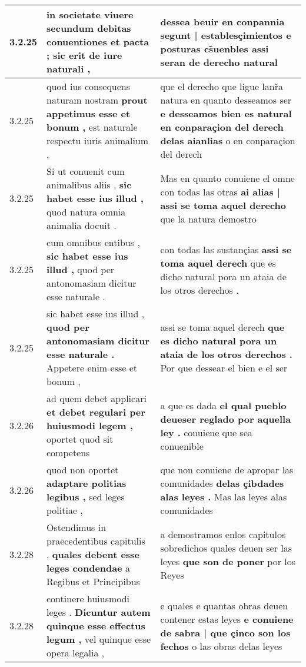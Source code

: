 \begin{tabular}{|p{1cm}|p{6.5cm}|p{6.5cm}|}
3.2.25 & in societate viuere \textbf{ secundum debitas conuentiones et pacta ; } sic erit de iure naturali , & dessea beuir en conpannia \textbf{ segunt | establesçimientos e posturas cs̃uenbles } assi seran de derecho natural \\\hline
3.2.25 & quod ius consequens naturam nostram \textbf{ prout appetimus esse et bonum , } est naturale respectu iuris animalium , & que el derecho que ligue lanr̃a natura en quanto desseamos ser \textbf{ e desseamos bien es natural en conparaçion del derech delas aianlias } o en conparaçion del derech \\\hline
3.2.25 & Si ut conuenit cum animalibus aliis , \textbf{ sic habet esse ius illud , } quod natura omnia animalia docuit . & Mas en quanto conuiene el omne con todas las otras \textbf{ ai alias | assi se toma aquel derecho } que la natura demostro \\\hline
3.2.25 & cum omnibus entibus , \textbf{ sic habet esse ius illud , } quod per antonomasiam dicitur esse naturale . & con todas las sustançias \textbf{ assi se toma aquel derech } que es dicho natural pora un ataia de los otros derechos . \\\hline
3.2.25 & sic habet esse ius illud , \textbf{ quod per antonomasiam dicitur esse naturale . } Appetere enim esse et bonum , & assi se toma aquel derech \textbf{ que es dicho natural pora un ataia de los otros derechos . } Por que dessear el bien e el ser \\\hline
3.2.26 & ad quem debet applicari \textbf{ et debet regulari per huiusmodi legem , } oportet quod sit competens & a que es dada \textbf{ el qual pueblo deueser reglado por aquella ley . } conuiene que sea conuenible \\\hline
3.2.26 & quod non oportet \textbf{ adaptare politias legibus , } sed leges politiae , & que non conuiene de apropar las comunidades \textbf{ delas çibdades alas leyes . } Mas las leyes alas comunidades \\\hline
3.2.28 & Ostendimus in praecedentibus capitulis , \textbf{ quales debent esse leges condendae } a Regibus et Principibus & a demostramos enlos capitulos sobredichos quales deuen ser las leyes \textbf{ que son de poner } por los Reyes \\\hline
3.2.28 & continere huiusmodi leges . \textbf{ Dicuntur autem quinque esse effectus legum , } vel quinque esse opera legalia , & e quales e quantas obras deuen contener estas leyes \textbf{ e conuiene de sabra | que çinco son los fechos } o las obras delas leyes \\\hline

\end{tabular}
